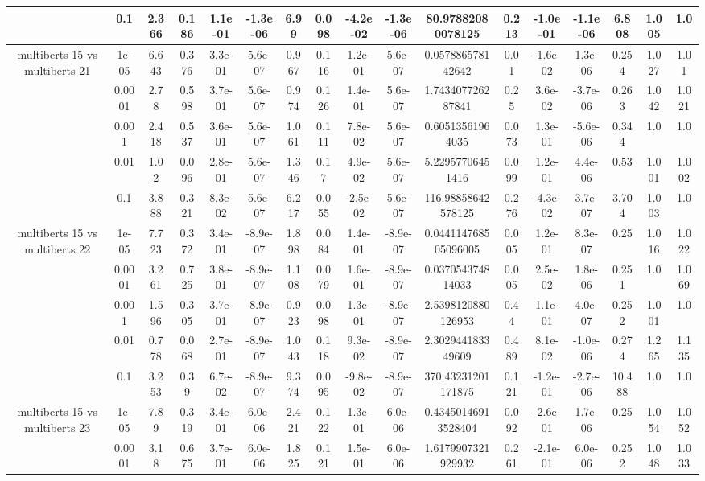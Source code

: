 \begin{tabular}{|c|c|c|c|c|c|c|c|c|c|c|c|c|c|c|c|c|}
 & 0.1 & 2.366 & 0.186 & 1.1e-01 & -1.3e-06 & 6.99 & 0.098 & -4.2e-02 & -1.3e-06 & 80.97882080078125 & 0.213 & -1.0e-01 & -1.1e-06 & 6.808 & 1.005 & 1.0 \\
\hline
\multirow{5}{*}{multiberts 15 vs multiberts 21} & 1e-05 & 6.643 & 0.376 & 3.3e-01 & 5.6e-07 & 0.967 & 0.116 & 1.2e-01 & 5.6e-07 & 0.057886578142642 & 0.01 & -1.6e-02 & 1.3e-06 & 0.254 & 1.027 & 1.01 \\
 & 0.0001 & 2.78 & 0.598 & 3.7e-01 & 5.6e-07 & 0.974 & 0.126 & 1.4e-01 & 5.6e-07 & 1.743407726287841 & 0.25 & 3.6e-02 & -3.7e-06 & 0.263 & 1.042 & 1.021 \\
 & 0.001 & 2.418 & 0.537 & 3.6e-01 & 5.6e-07 & 1.061 & 0.111 & 7.8e-02 & 5.6e-07 & 0.60513561964035 & 0.073 & 1.3e-01 & -5.6e-06 & 0.344 & 1.0 & 1.0 \\
 & 0.01 & 1.02 & 0.096 & 2.8e-01 & 5.6e-07 & 1.346 & 0.17 & 4.9e-02 & 5.6e-07 & 5.22957706451416 & 0.099 & 1.2e-01 & 4.4e-06 & 0.53 & 1.001 & 1.002 \\
 & 0.1 & 3.888 & 0.321 & 8.3e-02 & 5.6e-07 & 6.217 & 0.055 & -2.5e-02 & 5.6e-07 & 116.98858642578125 & 0.276 & -4.3e-02 & 3.7e-07 & 3.704 & 1.003 & 1.0 \\
\hline
\multirow{5}{*}{multiberts 15 vs multiberts 22} & 1e-05 & 7.723 & 0.372 & 3.4e-01 & -8.9e-07 & 1.898 & 0.084 & 1.4e-01 & -8.9e-07 & 0.044114768505096005 & 0.005 & 1.2e-01 & 8.3e-07 & 0.25 & 1.016 & 1.022 \\
 & 0.0001 & 3.261 & 0.725 & 3.8e-01 & -8.9e-07 & 1.108 & 0.079 & 1.6e-01 & -8.9e-07 & 0.037054374814033 & 0.005 & 2.5e-02 & 1.8e-06 & 0.251 & 1.0 & 1.069 \\
 & 0.001 & 1.596 & 0.305 & 3.7e-01 & -8.9e-07 & 0.923 & 0.098 & 1.3e-01 & -8.9e-07 & 2.5398120880126953 & 0.44 & 1.1e-01 & 4.0e-07 & 0.252 & 1.001 & 1.0 \\
 & 0.01 & 0.778 & 0.068 & 2.7e-01 & -8.9e-07 & 1.043 & 0.118 & 9.3e-02 & -8.9e-07 & 2.302944183349609 & 0.489 & 8.1e-02 & -1.0e-06 & 0.274 & 1.265 & 1.135 \\
 & 0.1 & 3.253 & 0.39 & 6.7e-02 & -8.9e-07 & 9.374 & 0.095 & -9.8e-02 & -8.9e-07 & 370.43231201171875 & 0.121 & -1.2e-01 & -2.7e-06 & 10.488 & 1.0 & 1.0 \\
\hline
\multirow{5}{*}{multiberts 15 vs multiberts 23} & 1e-05 & 7.89 & 0.319 & 3.4e-01 & 6.0e-06 & 2.421 & 0.122 & 1.3e-01 & 6.0e-06 & 0.43450146913528404 & 0.092 & -2.6e-01 & 1.7e-06 & 0.25 & 1.054 & 1.052 \\
 & 0.0001 & 3.18 & 0.675 & 3.7e-01 & 6.0e-06 & 1.825 & 0.121 & 1.5e-01 & 6.0e-06 & 1.6179907321929932 & 0.261 & -2.1e-01 & 6.0e-06 & 0.252 & 1.048 & 1.033 \\

\end{tabular}
